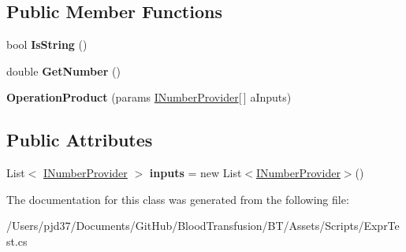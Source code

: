 \subsection*{Public Member Functions}
\begin{DoxyCompactItemize}
\item 
bool {\bfseries Is\+String} ()\hypertarget{class_b83_1_1_logic_expression_parser_1_1_operation_product_aca015a657a22356d725b09ba99ea4664}{}\label{class_b83_1_1_logic_expression_parser_1_1_operation_product_aca015a657a22356d725b09ba99ea4664}

\item 
double {\bfseries Get\+Number} ()\hypertarget{class_b83_1_1_logic_expression_parser_1_1_operation_product_ad4a42330b921253d49e45db96fd31c6f}{}\label{class_b83_1_1_logic_expression_parser_1_1_operation_product_ad4a42330b921253d49e45db96fd31c6f}

\item 
{\bfseries Operation\+Product} (params \hyperlink{interface_b83_1_1_logic_expression_parser_1_1_i_number_provider}{I\+Number\+Provider}\mbox{[}$\,$\mbox{]} a\+Inputs)\hypertarget{class_b83_1_1_logic_expression_parser_1_1_operation_product_aca04237785880eadf75b948f2eb5f112}{}\label{class_b83_1_1_logic_expression_parser_1_1_operation_product_aca04237785880eadf75b948f2eb5f112}

\end{DoxyCompactItemize}
\subsection*{Public Attributes}
\begin{DoxyCompactItemize}
\item 
List$<$ \hyperlink{interface_b83_1_1_logic_expression_parser_1_1_i_number_provider}{I\+Number\+Provider} $>$ {\bfseries inputs} = new List$<$\hyperlink{interface_b83_1_1_logic_expression_parser_1_1_i_number_provider}{I\+Number\+Provider}$>$()\hypertarget{class_b83_1_1_logic_expression_parser_1_1_operation_product_ab6464bf51ee05e7f59729b8d6c0837da}{}\label{class_b83_1_1_logic_expression_parser_1_1_operation_product_ab6464bf51ee05e7f59729b8d6c0837da}

\end{DoxyCompactItemize}


The documentation for this class was generated from the following file\+:\begin{DoxyCompactItemize}
\item 
/\+Users/pjd37/\+Documents/\+Git\+Hub/\+Blood\+Transfusion/\+B\+T/\+Assets/\+Scripts/Expr\+Test.\+cs\end{DoxyCompactItemize}

